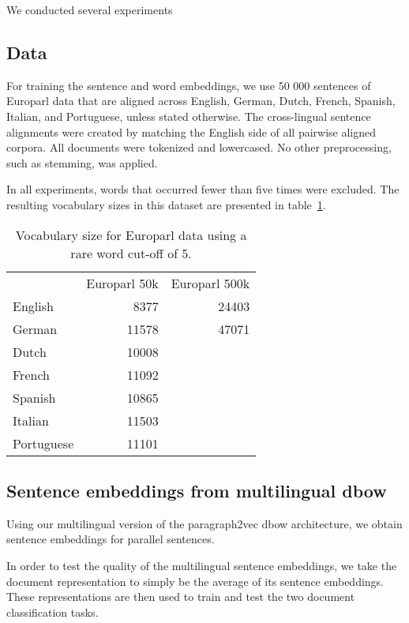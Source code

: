 
We conducted several experiments 

\subsection{Data}
For training the sentence and word embeddings, we use 50 000 sentences of Europarl data that are aligned across English, German, Dutch, French, Spanish, Italian, and Portuguese, unless stated otherwise. The cross-lingual sentence alignments were created by matching the English side of all pairwise aligned corpora.
All documents were tokenized and lowercased. No other preprocessing, such as stemming, was applied.


In all experiments, words that occurred fewer than five times were excluded.
The resulting vocabulary sizes in this dataset are presented  in table~\ref{t:vocabularies}.

\begin{table}
\center
\begin{tabular}{l r r}
		&Europarl 50k 	&Europarl 500k\\
English	&8377			&24403	\\	
German	&11578		&47071	\\
Dutch		&10008				\\
French	&11092				\\	
Spanish	&10865				\\
Italian		&11503				\\
Portuguese	&11101				\\
\end{tabular}
\caption{Vocabulary size for Europarl data using a rare word cut-off of 5.}
\label{t:vocabularies}
\end{table}


\subsection{Sentence embeddings from multilingual dbow}

Using our multilingual version of the paragraph2vec dbow architecture, we obtain sentence embeddings for parallel sentences. 




In order to test the quality of the multilingual sentence embeddings, we take the document representation to simply be the average of its sentence embeddings. These representations are then used to train and test the two document classification tasks.


